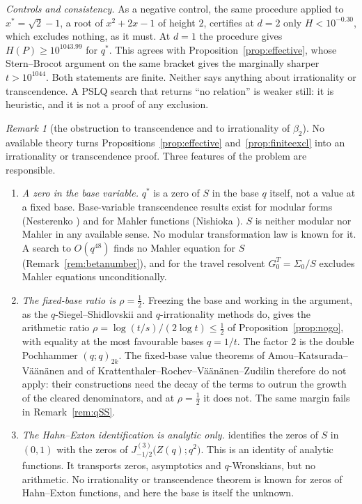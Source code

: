 \documentclass[11pt]{article}
\theoremstyle{plain}
\theoremstyle{definition}
\theoremstyle{remark}
\newtheorem{remark}[theorem]{Remark}
\begin{document}
\noindent\emph{Controls and consistency.} As a negative control, the same procedure applied to
$x^\ast=\sqrt2-1$, a root of $x^2+2x-1$ of height $2$, certifies at $d=2$ only $H<10^{-0.30}$, which
excludes nothing, as it must. At $d=1$ the procedure gives $H(P)\ge10^{1043.99}$ for $q^\ast$. This
agrees with Proposition~\ref{prop:effective}, whose Stern--Brocot argument on the same bracket gives
the marginally sharper $t>10^{1044}$. Both statements are finite. Neither says anything about
irrationality or transcendence. A PSLQ search that returns ``no relation'' is weaker still: it is
heuristic, and it is not a proof of any exclusion.

\begin{remark}[the obstruction to transcendence and to irrationality of $\beta_2$]
\label{rem:betawall}
No available theory turns Propositions~\ref{prop:effective} and~\ref{prop:finiteexcl} into an
irrationality or transcendence proof. Three features of the problem are responsible.
\begin{enumerate}[label=\textup{(\roman*)},leftmargin=2.2em,itemsep=0.1em,topsep=0.2em]
\item \emph{A zero in the base variable.} $q^\ast$ is a zero of $S$ in the base $q$ itself, not a value
at a fixed base. Base-variable transcendence results exist for modular forms (Nesterenko
\cite{Nesterenko1996}) and for Mahler functions (Nishioka \cite{Nishioka1996}). $S$ is neither modular
nor Mahler in any available sense. No modular transformation law is known for it. A search to
$O(q^{48})$ finds no Mahler equation for $S$ (Remark~\ref{rem:betanumber}), and for the travel
resolvent $G^T_0=\Sigma_0/S$ {\cite[Proposition \textup{prop:noqdiff}]{Bonfioli2026bA}} excludes Mahler equations
unconditionally.
\item \emph{The fixed-base ratio is $\rho=\tfrac12$.} Freezing the base and working in the argument,
as the $q$-Siegel--Shidlovskii and $q$-irrationality methods do, gives the arithmetic ratio
$\rho=\log(t/s)/(2\log t)\le\tfrac12$ of Proposition~\ref{prop:nogo}, with equality at the most
favourable bases $q=1/t$. The factor $2$ is the double Pochhammer $(q;q)_{2k}$. The fixed-base value
theorems of Amou--Katsurada--V\"a\"an\"anen \cite{AKV2002} and of
Krattenthaler--Rochev--V\"a\"an\"anen--Zudilin \cite{KRVZ2009} therefore do not apply: their
constructions need the decay of the terms to outrun the growth of the cleared denominators, and at
$\rho=\tfrac12$ it does not. The same margin fails in Remark~\ref{rem:qSS}.
\item \emph{The Hahn--Exton identification is analytic only.} {\cite[Corollary ``the travel poles are Hahn--Exton zeros'', \textup{cor:qbessel}]{Bonfioli2026bA}} identifies
the zeros of $S$ in $(0,1)$ with the zeros of $J^{(3)}_{-1/2}\bigl(Z(q);q^2\bigr)$. This is an
identity of analytic functions. It transports zeros, asymptotics and $q$-Wronskians, but no arithmetic. No irrationality or
transcendence theorem is known for zeros of Hahn--Exton functions, and here the base is itself the
unknown.
\end{enumerate}
\end{remark}
\end{document}
